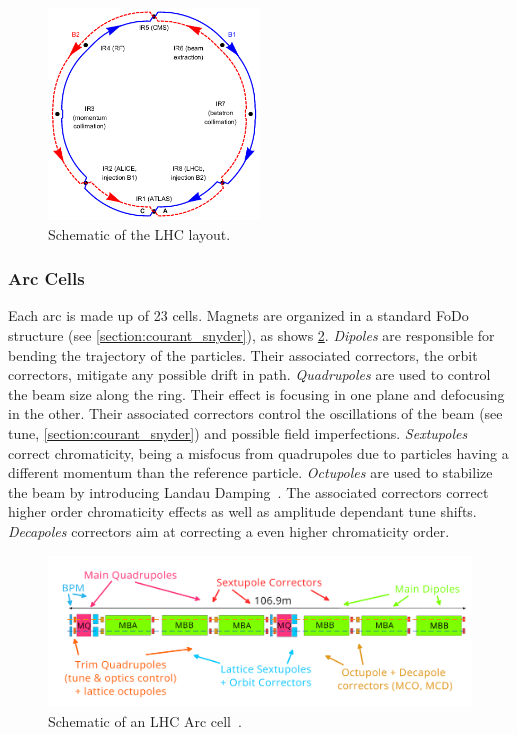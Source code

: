 \begin{figure}[!htb]
    \centering
    \includegraphics[width=0.5\textwidth]{./images/irs.png}
    \caption{Schematic of the LHC layout.}
    \label{fig:introduction:lhc_irs}
\end{figure}


\subsubsection{Arc Cells}

Each arc is made up of 23 cells. Magnets are organized in a standard FoDo structure
(see \ref{section:courant_snyder}), as shows \cref{fig:introduction:lhc_arc_cell}.
\textit{Dipoles} are responsible for bending the trajectory of the particles. Their associated
correctors, the orbit correctors, mitigate any possible drift in path.
\textit{Quadrupoles} are used to control the beam size along the ring. Their effect is focusing in
one plane and defocusing in the other. Their associated correctors control the oscillations of the
beam (see tune, \ref{section:courant_snyder}) and possible field imperfections.
\textit{Sextupoles} correct chromaticity, being a misfocus from quadrupoles due to particles having
a different momentum than the reference particle.
\textit{Octupoles} are used to stabilize the beam by introducing Landau
Damping~\cite{gareyte_landau_1997}. The associated correctors correct higher order chromaticity
effects as well as amplitude dependant tune shifts.
\textit{Decapoles} correctors aim at correcting a even higher chromaticity order.

\begin{figure}[H]
    \centering
    \includegraphics[width=1\textwidth]{./images/lhc_cell.png}
    \caption{Schematic of an LHC Arc cell~\cite{bruning_lhc_2004}.}
    \label{fig:introduction:lhc_arc_cell}
\end{figure}



